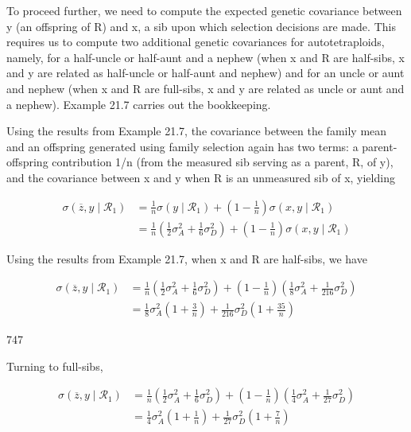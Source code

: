 \documentclass{article}
\begin{document}
To proceed further, we need to compute the expected genetic covariance between y (an offspring of R) and x, a sib upon which selection decisions are made. This requires us to compute two additional genetic covariances for autotetraploids, namely, for a half-uncle or half-aunt and a nephew (when x and R are half-sibs, x and y are related as half-uncle or half-aunt and nephew) and for an uncle or aunt and nephew (when x and R are full-sibs, x and y are related as uncle or aunt and a nephew). Example 21.7 carries out the bookkeeping.

Using the results from Example 21.7, the covariance between the family mean and an offspring generated using family selection again has two terms: a parent-offspring contribution 1/n (from the measured sib serving as a parent, R, of y), and the covariance between x and y when R is an unmeasured sib of x, yielding

\begin{equation}
\begin{align*}\sigma(\overline{z},y\mid\mathcal{R}_{1})&=\frac{1}{n}\sigma(y\mid\mathcal{R}_{1})+\left(1-\frac{1}{n}\right)\sigma(x,y\mid\mathcal{R}_{1})\\&=\frac{1}{n}\left(\frac{1}{2}\sigma_{A}^{2}+\frac{1}{6}\sigma_{D}^{2}\right)+\left(1-\frac{1}{n}\right)\sigma(x,y\mid\mathcal{R}_{1})\end{align*}
\tag{21.33a}
\label{eq:21_33a}
\end{equation}

Using the results from Example 21.7, when x and R are half-sibs, we have

\begin{equation}
\begin{aligned}\sigma(\overline{z},y\mid\mathcal{R}_{1})&=\frac{1}{n}\left(\frac{1}{2}\sigma_{A}^{2}+\frac{1}{6}\sigma_{D}^{2}\right)+\left(1-\frac{1}{n}\right)\left(\frac{1}{8}\sigma_{A}^{2}+\frac{1}{216}\sigma_{D}^{2}\right)\\&=\frac{1}{8}\sigma_{A}^{2}\left(1+\frac{3}{n}\right)+\frac{1}{216}\sigma_{D}^{2}\left(1+\frac{35}{n}\right)\end{aligned}
\tag{21.33b}
\label{eq:21_33b}
\end{equation}

747

Turning to full-sibs,

\begin{equation}
\begin{aligned}\sigma(\overline{z},y\mid\mathcal{R}_{1})&=\frac{1}{n}\left(\frac{1}{2}\sigma_{A}^{2}+\frac{1}{6}\sigma_{D}^{2}\right)+\left(1-\frac{1}{n}\right)\left(\frac{1}{4}\sigma_{A}^{2}+\frac{1}{27}\sigma_{D}^{2}\right)\\&=\frac{1}{4}\sigma_{A}^{2}\left(1+\frac{1}{n}\right)+\frac{1}{27}\sigma_{D}^{2}\left(1+\frac{7}{n}\right)\end{aligned}
\tag{21.33c}
\label{eq:21_33c}
\end{equation}
\end{document}
